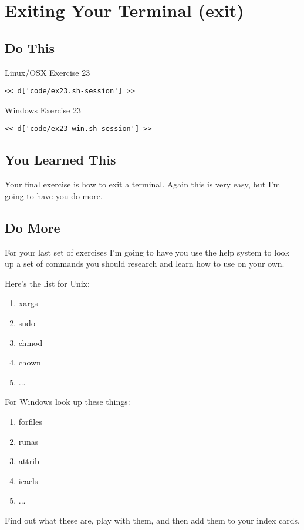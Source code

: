 \chapter{Exiting Your Terminal (exit)}

\section{Do This}

\begin{code}{Linux/OSX Exercise 23}
\begin{Verbatim}
<< d['code/ex23.sh-session'] >>
\end{Verbatim}
\end{code}

\begin{code}{Windows Exercise 23}
\begin{Verbatim}
<< d['code/ex23-win.sh-session'] >>
\end{Verbatim}
\end{code}

\section{You Learned This}

Your final exercise is how to exit a terminal.  Again this is very easy, but
I'm going to have you do more.

\section{Do More}

For your last set of exercises I'm going to have you use the help system to look up
a set of commands you should research and learn how to use on your own.

Here's the list for Unix:

\begin{enumerate}
\item xargs
\item sudo
\item chmod
\item chown
\item ...
\end{enumerate}


For Windows look up these things:

\begin{enumerate}
\item forfiles
\item runas
\item attrib
\item icacls
\item ...
\end{enumerate}

Find out what these are, play with them, and then add them to your index cards.
